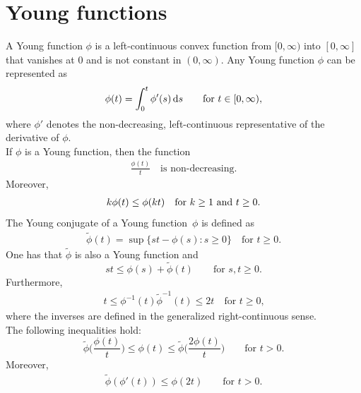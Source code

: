 \documentclass[leqno,11pt]{amsart}%
\numberwithin{equation}{section}
\def\d{\mathrm{d}}
\theoremstyle{definition}
\numberwithin{equation}{section}
\begin{document}
\section{Young functions}\label{sec:young}




A  Young
function $\phi$  is a left-continuous convex function  from  $[0, \infty )$ into  $[0, \infty ]$ that vanishes
at $0$ and is not constant in $(0, \infty)$. Any Young function $\phi$ can be represented as
\begin{equation}\label{A}
\phi(t) = \int _0^t \phi'(s)\, \d s \quad \quad \textup{for}\ t\in[0,\infty),
\end{equation}
 where $\phi '$ denotes the non-decreasing, left-continuous representative of the derivative of $\phi$. 
\\ If $\phi$ is a Young function, then the function
\begin{align}
    \label{incr}
    \frac{\phi(t)}{t} \quad \text{is non-decreasing.}
\end{align}
Moreover,
\begin{align}
    \label{{kt}}
    k\phi(t) \leq \phi(kt) \quad \text{for $k \geq 1$ and $t\geq 0$.}
\end{align}
The Young conjugate of a Young function~$\phi$ is defined as
\begin{align*}
  \widetilde \phi(t) = \sup\{st - \phi(s): s\geq 0\} 
  \quad \text{for $t \geq 0$.}
\end{align*}
One has that $\widetilde \phi$ is also a Young function and
\begin{equation}
  \label{Young-psi}
  st\le \phi(s)+\widetilde \phi(t)
  \qquad\mbox{for $s,t\ge0$.}
\end{equation}
Furthermore,
\begin{align}
    \label{inverses}
   t\leq \phi^{-1}(t)\widetilde \phi^{-1}(t) \leq 2t \quad \text{for $t \geq 0$,}
\end{align}
where the inverses are defined in the generalized right-continuous sense.
\\ The following inequalities hold:
\begin{equation}\label{complementary-N-functions}
  \widetilde\phi\Big(\frac{\phi(t)}{t}\Big)
  \le
   \phi(t)
  \le
  \widetilde \phi\Big(\frac{2\phi(t)}{t}\Big)
  \qquad
  \text{for $t>0$.}
\end{equation}
Moreover,
\begin{align}
    \label{july35}
    \widetilde\phi (\phi'(t))
  \le
   \phi(2t) \qquad
  \text{for $t>0$.}
\end{align}
\end{document}
